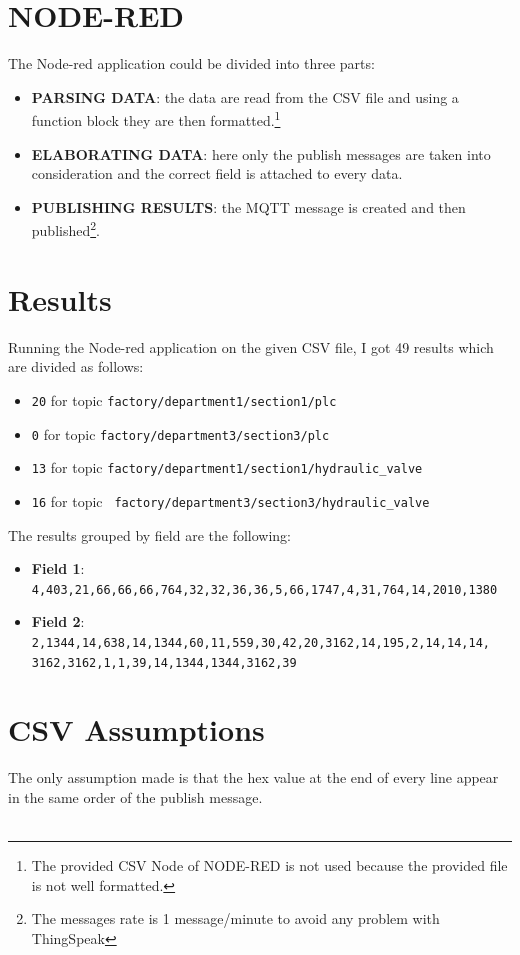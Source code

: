 \documentclass{article}
\begin{document}
	    \section{NODE-RED} %
		The Node-red application could be divided into three parts:
			\begin{itemize}
			\item \textbf{PARSING DATA}: the data are read from the CSV file and using a function block they are then formatted.\footnote{The provided CSV Node of NODE-RED is not used because the provided file is not well formatted.}
			\item \textbf{ELABORATING DATA}: here only the publish messages are taken into consideration and the correct field is attached to every data.
			\item \textbf{PUBLISHING RESULTS}: the MQTT message is created and then published\footnote{The messages rate is 1 message/minute to avoid any problem with ThingSpeak}.
            \end{itemize}
		
		\section{Results} %
		Running the Node-red application on the given CSV file, I got 49 results which are divided as follows:
		
		\begin{itemize}
		    \item \texttt{20} for topic \texttt{factory/department1/section1/plc}
		    \item \texttt{0} for topic \texttt{factory/department3/section3/plc}
		    \item \texttt{13} for topic \texttt{factory/department1/section1/hydraulic\_valve}
		    \item \texttt{16} for topic \texttt{ factory/department3/section3/hydraulic\_valve}

		\end{itemize}
		The results grouped by field are the following: 
		\begin{itemize}
		    \item \textbf{Field 1}: \texttt{4,403,21,66,66,66,764,32,32,36,36,5,66,1747,4,31,764,14,2010,1380}
		    \item \textbf{Field 2}: \texttt{2,1344,14,638,14,1344,60,11,559,30,42,20,3162,14,195,2,14,14,14,\\3162,3162,1,1,39,14,1344,1344,3162,39}
		\end{itemize}
		
		\section{CSV Assumptions} %
		The only assumption made is that the hex value at the end of every line appear in the same order of the publish message.\\\\
		\pagebreak
		\pagebreak
		\clearpage
\end{document}
